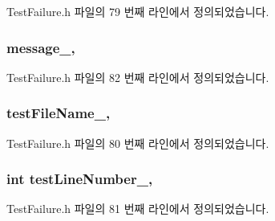 Test\+Failure.\+h 파일의 79 번째 라인에서 정의되었습니다.

\subsubsection[{\texorpdfstring{message\+\_\+}{message_}}]{ message\+\_\+\hspace{0.3cm}{\ttfamily [protected]}, {\ttfamily [inherited]}}\hypertarget{class_test_failure_af95aeab689fdb637c3e94b0c10db3e53}{}\label{class_test_failure_af95aeab689fdb637c3e94b0c10db3e53}


Test\+Failure.\+h 파일의 82 번째 라인에서 정의되었습니다.

\subsubsection[{\texorpdfstring{test\+File\+Name\+\_\+}{testFileName_}}]{ test\+File\+Name\+\_\+\hspace{0.3cm}{\ttfamily [protected]}, {\ttfamily [inherited]}}\hypertarget{class_test_failure_a19c231b59846532ec9d7ac8725886d67}{}\label{class_test_failure_a19c231b59846532ec9d7ac8725886d67}


Test\+Failure.\+h 파일의 80 번째 라인에서 정의되었습니다.

\subsubsection[{\texorpdfstring{test\+Line\+Number\+\_\+}{testLineNumber_}}]{\setlength{\rightskip}{0pt plus 5cm}int test\+Line\+Number\+\_\+\hspace{0.3cm}{\ttfamily [protected]}, {\ttfamily [inherited]}}\hypertarget{class_test_failure_abb1f7af8e12fc84b16898aa5b410ba2a}{}\label{class_test_failure_abb1f7af8e12fc84b16898aa5b410ba2a}


Test\+Failure.\+h 파일의 81 번째 라인에서 정의되었습니다.

